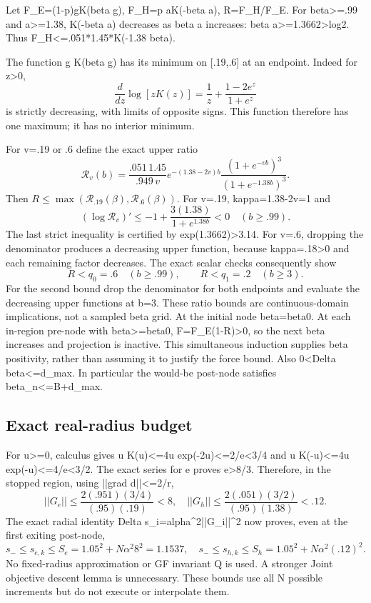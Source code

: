\documentclass[11pt,a4paper]{article}
\begin{document}
Let F\_E=(1-p)gK(beta g), F\_H=p aK(-beta a), R=F\_H/F\_E.
For beta>=.99 and a>=1.38, K(-beta a) decreases as beta a increases:
beta a>=1.3662>log2. Thus F\_H<=.051*1.45*K(-1.38 beta).

The function g K(beta g) has its minimum on [.19,.6] at an endpoint.
Indeed for z>0,
\[
 \frac{d}{dz}\log[zK(z)]=\frac1z+\frac{1-2e^z}{1+e^z}
\]
is strictly decreasing, with limits of opposite signs. This function
therefore has one maximum; it has no interior minimum.

For v=.19 or .6 define the exact upper ratio
\[
 \mathcal R_v(b)=\frac{.051\,1.45}{.949\,v}
 e^{-(1.38-2v)b}\frac{(1+e^{-vb})^3}{(1+e^{-1.38b})^3}.
\]
Then $R\le\max(\mathcal R_{.19}(\beta),\mathcal R_{.6}(\beta))$.
For v=.19, kappa=1.38-2v=1 and
\[
 (\log \mathcal R_v)' \le-1+\frac{3(1.38)}{1+e^{1.38b}}<0
 \quad(b\ge.99).
\]
The last strict inequality is certified by exp(1.3662)>3.14.
For v=.6, dropping the denominator produces a decreasing upper function,
because kappa=.18>0 and each remaining factor decreases.
The exact scalar checks consequently show
\[
 R<q_0=.6\quad(b\ge.99),\qquad
 R<q_1=.2\quad(b\ge3).
\]
For the second bound drop the denominator for both endpoints and evaluate
the decreasing upper functions at b=3.
These ratio bounds are continuous-domain implications, not a sampled beta
grid. At the initial node beta=beta0. At each in-region pre-node with
beta>=beta0, F=F\_E(1-R)>0, so the next beta increases and projection is
inactive. This simultaneous induction supplies beta positivity, rather
than assuming it to justify the force bound. Also 0<Delta beta<=d\_max.
In particular the would-be post-node satisfies beta\_n<=B+d\_max.

\subsection{Exact real-radius budget}

For u>=0, calculus gives
u K(u)<=4u exp(-2u)<=2/e<3/4 and
u K(-u)<=4u exp(-u)<=4/e<3/2.
The exact series for e proves e>8/3.
Therefore, in the stopped region, using ||grad d||<=2/r,
\[
 ||G_e||\le\frac{2(.951)(3/4)}{(.95)(.19)}<8,\quad
 ||G_h||\le\frac{2(.051)(3/2)}{(.95)(1.38)}<.12.
\]
The exact radial identity Delta s\_i=alpha\textasciicircum{}2||G\_i||\textasciicircum{}2 now proves, even at
the first exiting post-node,
\[
 s_-\le s_{e,k}\le S_e=1.05^2+N\alpha^2 8^2=1.1537,\quad
 s_-\le s_{h,k}\le S_h=1.05^2+N\alpha^2(.12)^2.
\]
No fixed-radius approximation or GF invariant Q is used. A stronger Joint objective
descent lemma is unnecessary. These bounds use all N possible increments
but do not execute or interpolate them.
\end{document}
